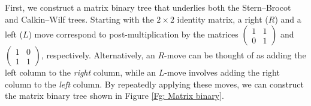 \documentclass[12pt]{article}
\theoremstyle{plain}
\theoremstyle{definition}
\theoremstyle{remark}
\begin{document}
First, we construct a matrix binary tree that underlies both the Stern--Brocot and Calkin--Wilf trees. Starting with the $ 2 \times 2 $ identity matrix, a right ($ R $) and a left ($ L $) move correspond to post-multiplication by the matrices $ \begin{pmatrix} 1 & 1 \\ 0 & 1 \end{pmatrix} $ and $ \begin{pmatrix} 1 & 0 \\ 1 & 1 \end{pmatrix} $, respectively. Alternatively, an $ R $-move can be thought of as adding the left column to the \textit{right} column, while an $ L $-move involves adding the right column to the \textit{left} column. By repeatedly applying these moves, we can construct the matrix binary tree shown in Figure \ref{Fg: Matrix binary}.
\end{document}
